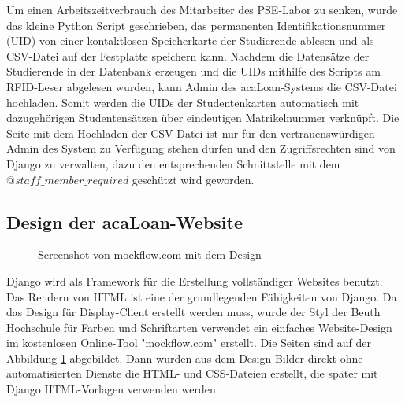 Um einen  Arbeitszeitverbrauch des Mitarbeiter des PSE-Labor zu senken, wurde das kleine Python Script geschrieben, das permanenten Identifikationsnummer (UID) von einer kontaktlosen Speicherkarte der Studierende ablesen und als CSV-Datei auf der Festplatte speichern kann. Nachdem die Datensätze der Studierende in der Datenbank erzeugen und die UIDs mithilfe des Scripts am RFID-Leser abgelesen wurden, kann Admin des acaLoan-Systems die CSV-Datei hochladen. Somit werden die UIDs der Studentenkarten automatisch mit dazugehörigen Studentensätzen über eindeutigen Matrikelnummer verknüpft. Die Seite mit dem Hochladen der CSV-Datei ist nur für den vertrauenswürdigen Admin des System zu Verfügung stehen dürfen und den Zugriffsrechten sind von Django zu verwalten, dazu den entsprechenden Schnittstelle mit dem $@staff\_member\_required$ geschützt wird geworden.

\subsection{Design der acaLoan-Website}
\label{sec:server:design}
\begin{figure}
	\centering
	\caption{Screenshot von mockflow.com mit dem Design}
	\label{fig:design}
\end{figure}
Django wird als Framework für die Erstellung vollständiger Websites benutzt. Das Rendern von HTML ist eine der grundlegenden Fähigkeiten von Django. Da das Design für Display-Client erstellt werden muss, wurde der Styl der Beuth Hochschule für Farben und Schriftarten verwendet ein einfaches Website-Design im kostenlosen Online-Tool "mockflow.com" erstellt. Die Seiten sind auf der Abbildung \ref{fig:design} abgebildet. Dann wurden aus dem Design-Bilder direkt ohne automatisierten Dienste die HTML- und CSS-Dateien erstellt, die später mit Django HTML-Vorlagen verwenden werden.  

